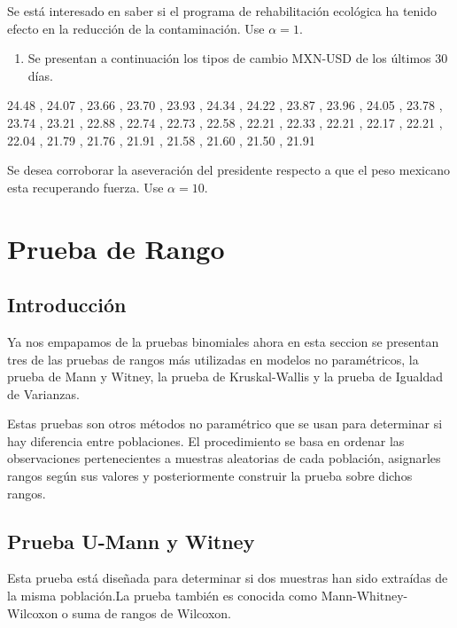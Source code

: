 \documentclass[
  a4paper,
  oneside,
  openany]{book}
\providecommand{\tightlist}{%
  \setlength{\itemsep}{0pt}\setlength{\parskip}{0pt}}
\begin{document}
Se está interesado en saber si el programa de rehabilitación ecológica ha tenido efecto en la reducción de la contaminación. Use \(\alpha =1%
\).

\begin{enumerate}
\def\labelenumi{\arabic{enumi}.}
\setcounter{enumi}{1}
\tightlist
\item
  Se presentan a continuación los tipos de cambio MXN-USD de los últimos 30 días.
\end{enumerate}

24.48 ,
24.07 ,
23.66 ,
23.70 ,
23.93 ,
24.34 ,
24.22 ,
23.87 ,
23.96 ,
24.05 ,
23.78 ,
23.74 ,
23.21 ,
22.88 ,
22.74 ,
22.73 ,
22.58 ,
22.21 ,
22.33 ,
22.21 ,
22.17 ,
22.21 ,
22.04 ,
21.79 ,
21.76 ,
21.91 ,
21.58 ,
21.60 ,
21.50 ,
21.91

Se desea corroborar la aseveración del presidente respecto a que el peso mexicano esta recuperando fuerza. Use \(\alpha =10%
\).

\hypertarget{part-prueba-de-rango}{%
\part{Prueba de Rango}\label{part-prueba-de-rango}}

\hypertarget{introducciuxf3n-1}{%
\chapter*{Introducción}\label{introducciuxf3n-1}}


Ya nos empapamos de la pruebas binomiales ahora en esta seccion se presentan tres de las pruebas de rangos más utilizadas en modelos no paramétricos, la prueba de Mann y Witney, la prueba de Kruskal-Wallis y la prueba de Igualdad de Varianzas.

Estas pruebas son otros métodos no paramétrico que se usan para determinar si hay diferencia entre poblaciones. El procedimiento se basa en ordenar las observaciones pertenecientes a muestras aleatorias de cada población, asignarles rangos según sus valores y posteriormente construir la prueba sobre dichos rangos.

\hypertarget{prueba-u-mann-y-witney}{%
\chapter{Prueba U-Mann y Witney}\label{prueba-u-mann-y-witney}}

Esta prueba está diseñada para determinar si dos muestras han sido extraídas de la misma población.La prueba también es conocida como Mann-Whitney-Wilcoxon o suma de rangos de Wilcoxon.
\end{document}

